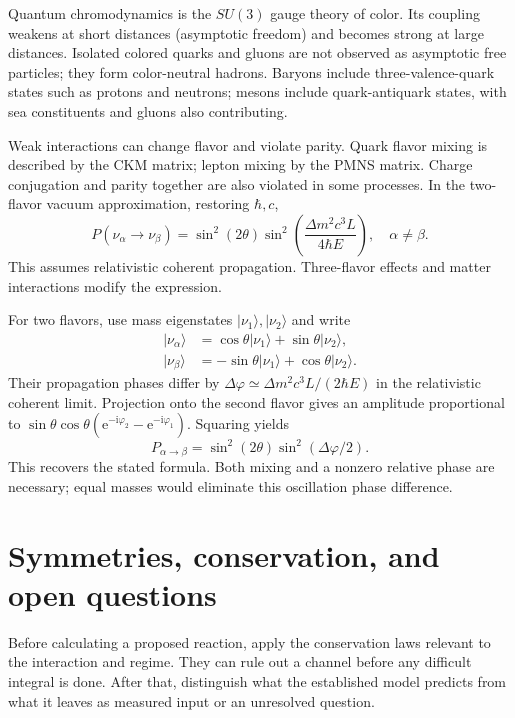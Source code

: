 \documentclass[11pt,oneside]{book}
\newcommand{\ii}{\mathrm{i}}
\newcommand{\ee}{\mathrm{e}}
\newcommand{\ket}[1]{\lvert #1\rangle}
\theoremstyle{reviewstyle}
\begin{document}
Quantum chromodynamics is the $SU(3)$ gauge theory of color. Its coupling weakens at short distances (asymptotic freedom) and becomes strong at large distances. Isolated colored quarks and gluons are not observed as asymptotic free particles; they form color-neutral hadrons. Baryons include three-valence-quark states such as protons and neutrons; mesons include quark-antiquark states, with sea constituents and gluons also contributing.

Weak interactions can change flavor and violate parity. Quark flavor mixing is described by the CKM matrix; lepton mixing by the PMNS matrix. Charge conjugation and parity together are also violated in some processes. In the two-flavor vacuum approximation, restoring $\hbar,c$,
\begin{equation}P(\nu_\alpha\to\nu_\beta)=\sin^2(2\theta)\sin^2\left(\frac{\Delta m^2c^3L}{4\hbar E}\right),\quad \alpha\neq\beta.\end{equation}
This assumes relativistic coherent propagation. Three-flavor effects and matter interactions modify the expression.

For two flavors, use mass eigenstates $\ket{\nu_1},\ket{\nu_2}$ and write
\begin{align}
\ket{\nu_\alpha}&=\cos\theta\ket{\nu_1}+\sin\theta\ket{\nu_2},\\
\ket{\nu_\beta}&=-\sin\theta\ket{\nu_1}+\cos\theta\ket{\nu_2}.
\end{align}
Their propagation phases differ by $\Delta\varphi\simeq\Delta m^2c^3L/(2\hbar E)$ in the relativistic coherent limit. Projection onto the second flavor gives an amplitude proportional to $\sin\theta\cos\theta(\ee^{-\ii\varphi_2}-\ee^{-\ii\varphi_1})$. Squaring yields
\begin{equation}
P_{\alpha\to\beta}=\sin^2(2\theta)\sin^2(\Delta\varphi/2).
\end{equation}
This recovers the stated formula. Both mixing and a nonzero relative phase are necessary; equal masses would eliminate this oscillation phase difference.

\section{Symmetries, conservation, and open questions}
Before calculating a proposed reaction, apply the conservation laws relevant to the interaction and regime. They can rule out a channel before any difficult integral is done. After that, distinguish what the established model predicts from what it leaves as measured input or an unresolved question.
\end{document}
